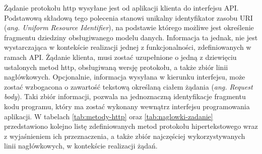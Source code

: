 Żądanie protokołu http wysyłane jest od aplikacji klienta do interfejsu API. Podstawową składową tego polecenia stanowi unikalny identyfikator zasobu URI (\textit{ang. Uniform Resource Identifier}), na podstawie którego możliwe jest określenie fragmentu dziedziny obsługiwanego modelu danych. Informacja ta jednak, nie jest wystarczająca w kontekście realizacji jednej z funkcjonalności, zdefiniowanych w ramach API. Żądanie klienta, musi zostać uzupełnione o jedną z dziewięciu ustalonych metod http, obsługiwaną wersję protokołu, a także zbiór linii nagłówkowych. Opcjonalnie, informacja wysyłana w kierunku interfejsu, może zostać wzbogacona o zawartość tekstową określaną ciałem żądania (\textit{ang. Request body}). Taki zbiór informacji, pozwala na jednoznaczną identyfikacje fragmentu kodu programu, który ma zostać wykonany wewnątrz interfejsu programowania aplikacji. W tabelach \ref{tab:metody-http} oraz \ref{tab:naglowki-zadanie} przedstawiono kolejno listę zdefiniowanych metod protokołu hipertekstowego wraz z wyjaśnieniem ich przeznaczenia, a także zbiór najczęściej wykorzystywanych linii nagłówkowych, w kontekście realizacji żądań.

